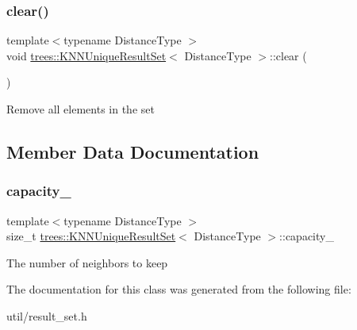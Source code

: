 \subsubsection{\texorpdfstring{clear()}{clear()}}
{\footnotesize\ttfamily template$<$typename Distance\+Type $>$ \\
void \hyperlink{classtrees_1_1_k_n_n_unique_result_set}{trees\+::\+K\+N\+N\+Unique\+Result\+Set}$<$ Distance\+Type $>$\+::clear (\begin{DoxyParamCaption}{ }\end{DoxyParamCaption})\hspace{0.3cm}{\ttfamily [inline]}}

Remove all elements in the set 

\subsection{Member Data Documentation}
\mbox{\label{classtrees_1_1_k_n_n_unique_result_set_a52a3e1ea392eeace263f540865a55250}} 
\subsubsection{\texorpdfstring{capacity\+\_\+}{capacity\_}}
{\footnotesize\ttfamily template$<$typename Distance\+Type $>$ \\
size\+\_\+t \hyperlink{classtrees_1_1_k_n_n_unique_result_set}{trees\+::\+K\+N\+N\+Unique\+Result\+Set}$<$ Distance\+Type $>$\+::capacity\+\_\+\hspace{0.3cm}{\ttfamily [protected]}}

The number of neighbors to keep 

The documentation for this class was generated from the following file\+:\begin{DoxyCompactItemize}
\item 
util/result\+\_\+set.\+h\end{DoxyCompactItemize}
